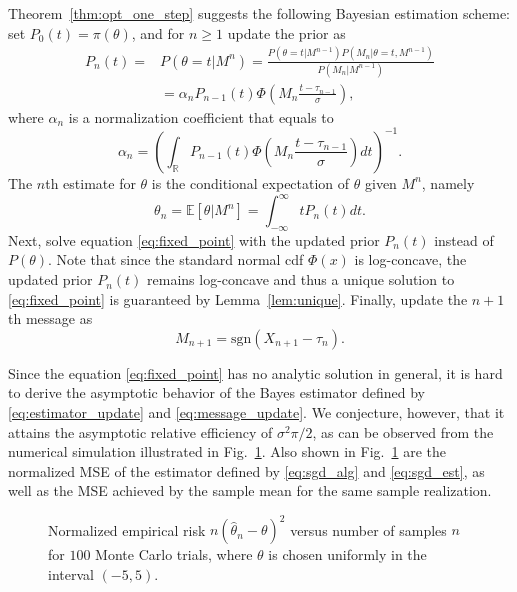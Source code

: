 \documentclass[letterpaper, conference]{IEEEtran}      %
\newcommand{\sgn}{\mathrm{sgn} }
\begin{document}
Theorem~\ref{thm:opt_one_step} suggests the following Bayesian estimation scheme: set $P_0(t) = \pi(\theta)$, and for $n\geq 1$ update the prior as
\begin{align}
P_n(t) = & P(\theta=t |M^n) = \frac{ P\left( \theta=t | M^{n-1} \right) P(M_n | \theta = t , M^{n-1})  } { P(M_n | M^{n-1} )} \nonumber \\ 
& = \alpha_n  P_{n-1}(t) \Phi\left(M_n \frac{ t - \tau_{n-1} }{\sigma} \right), \label{eq:density_update}
\end{align}
where $\alpha_n$ is a normalization coefficient that equals to
\[
\alpha_n = \left(\int_{\mathbb R} P_{n-1}(t) \Phi\left(M_n \frac{t- \tau_{n-1} }{\sigma} \right)  dt \right)^{-1}. 
\]
The $n$th estimate for $\theta$ is the conditional expectation of $\theta$ given $M^n$, namely
\begin{equation}
\theta_n = \mathbb E \left[ \theta| M^n\right] = \int_{-\infty}^\infty t P_n(t) dt. \label{eq:estimator_update}
\end{equation}
Next, solve equation \eqref{eq:fixed_point} with the updated prior $P_n(t)$ instead of $P(\theta)$. Note that since the standard normal cdf $\Phi(x)$ is log-concave, the updated prior $P_n(t)$ remains log-concave and thus a unique solution to \eqref{eq:fixed_point} is guaranteed by Lemma~\ref{lem:unique}. Finally, update the $n+1$th message as
\begin{equation}\label{eq:message_update}
M_{n+1} = \sgn(X_{n+1}-\tau_n).
\end{equation}

Since the equation \eqref{eq:fixed_point} has no analytic solution in general, it is hard to derive the asymptotic behavior of the Bayes estimator defined by \eqref{eq:estimator_update} and \eqref{eq:message_update}. We conjecture, however, that it attains the asymptotic relative efficiency of $\sigma^2\pi/2$, as can be observed from the numerical simulation illustrated in Fig.~\ref{fig:adaptive_error}. Also shown in Fig.~\ref{fig:adaptive_error} are the normalized MSE of the estimator defined by \eqref{eq:sgd_alg} and \eqref{eq:sgd_est}, as well as the MSE achieved by the sample mean for the same sample realization. 



\begin{figure}
\begin{center}
\caption{Normalized empirical risk $n\left(\widehat{\theta}_n-\theta\right)^2$ versus number of samples $n$ for $100$ Monte Carlo trials, where $\theta$ is chosen uniformly in the interval $(-5,5)$. \label{fig:adaptive_error}  }
\end{center}
\end{figure}
\end{document}
